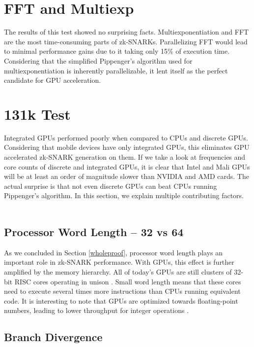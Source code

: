 \section{FFT and Multiexp}

The results of this test showed no surprising facts. Multiexponentiation and FFT are the most time-consuming parts of zk-SNARKs. Parallelizing FFT would lead to minimal performance gains due to it taking only 15\% of execution time. Considering that the simplified Pippenger's algorithm used for multiexponentiation is inherently parallelizable, it lent itself as the perfect candidate for GPU acceleration.

\section{131k Test}

Integrated GPUs performed poorly when compared to CPUs and discrete GPUs. Considering that mobile devices have only integrated GPUs, this eliminates GPU accelerated zk-SNARK generation on them. If we take a look at frequencies and core counts of discrete and integrated GPUs, it is clear that Intel and Mali GPUs will be at least an order of magnitude slower than NVIDIA and AMD cards. The actual surprise is that not even discrete GPUs can beat CPUs running Pippenger's algorithm. In this section, we explain multiple contributing factors.\\
\\
\subsection{Processor Word Length -- 32 vs 64}

As we concluded in Section \ref{wholeproof}, processor word length plays an important role in zk-SNARK performance. With GPUs, this effect is further amplified by the memory hierarchy. All of today's GPUs are still clusters of 32-bit RISC cores operating in unison \cite{nvidiapascalinstructions, amdpolarisinstructions}. Small word length means that these cores need to execute several times more instructions than CPUs running equivalent code. It is interesting to note that GPUs are optimized towards floating-point numbers, leading to lower throughput for integer operations \cite{nvidiathroughput}.\\

\subsection{Branch Divergence}

